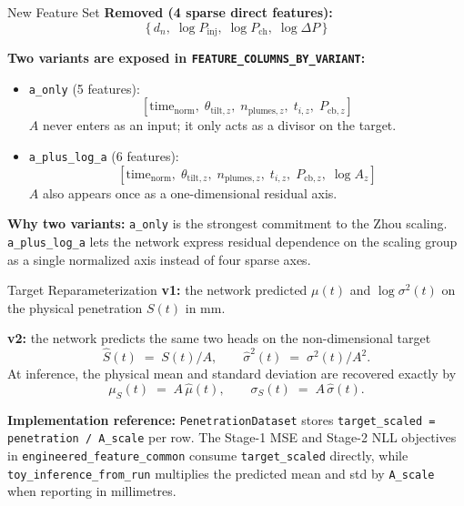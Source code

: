 \documentclass[UTF8,aspectratio=169]{ctexbeamer}
\begin{document}
\begin{frame}{New Feature Set}
\textbf{Removed (4 sparse direct features):}
\[
\{\,d_n,\;\log P_{\mathrm{inj}},\;\log P_{\mathrm{ch}},\;\log\Delta P\,\}
\]

\textbf{Two variants are exposed in \texttt{FEATURE\_COLUMNS\_BY\_VARIANT}:}
\begin{itemize}
  \item \texttt{a\_only} (5 features):
  \[
  [\text{time}_{\mathrm{norm}},\;\theta_{\mathrm{tilt},z},\;n_{\mathrm{plumes},z},\;t_{i,z},\;P_{\mathrm{cb},z}]
  \]
  $A$ never enters as an input; it only acts as a divisor on the target.
  \item \texttt{a\_plus\_log\_a} (6 features):
  \[
  [\text{time}_{\mathrm{norm}},\;\theta_{\mathrm{tilt},z},\;n_{\mathrm{plumes},z},\;t_{i,z},\;P_{\mathrm{cb},z},\;\log A_z]
  \]
  $A$ also appears once as a one-dimensional residual axis.
\end{itemize}

\textbf{Why two variants:} \texttt{a\_only} is the strongest commitment to the Zhou scaling. \texttt{a\_plus\_log\_a} lets the network express residual dependence on the scaling group as a single normalized axis instead of four sparse axes.
\end{frame}

\begin{frame}{Target Reparameterization}
\textbf{v1:} the network predicted $\mu(t)$ and $\log\sigma^2(t)$ on the physical penetration $S(t)$ in mm.

\vspace{0.3em}
\textbf{v2:} the network predicts the same two heads on the non-dimensional target
\[
\hat S(t)\;=\;S(t)/A,\qquad
\hat\sigma^2(t)\;=\;\sigma^2(t)/A^{2}.
\]
At inference, the physical mean and standard deviation are recovered exactly by
\[
\mu_S(t)\;=\;A\,\hat\mu(t),\qquad
\sigma_S(t)\;=\;A\,\hat\sigma(t).
\]

\vspace{0.3em}
\textbf{Implementation reference:} \texttt{PenetrationDataset} stores \texttt{target\_scaled = penetration / A\_scale} per row. The Stage-1 MSE and Stage-2 NLL objectives in \texttt{engineered\_feature\_common} consume \texttt{target\_scaled} directly, while \texttt{toy\_inference\_from\_run} multiplies the predicted mean and std by \texttt{A\_scale} when reporting in millimetres.
\end{frame}
\end{document}
